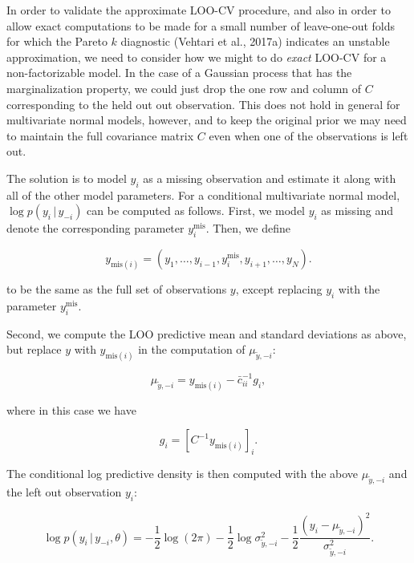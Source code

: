 \documentclass[english,,doc,floatsintext]{apa6}
\theoremstyle{definition}
\theoremstyle{definition}
\theoremstyle{definition}
\theoremstyle{remark}
\begin{document}
In order to validate the approximate LOO-CV procedure, and also in order
to allow exact computations to be made for a small number of
leave-one-out folds for which the Pareto \(k\) diagnostic (Vehtari et
al., 2017a) indicates an unstable approximation, we need to consider how
we might to do \emph{exact} LOO-CV for a non-factorizable model. In the
case of a Gaussian process that has the marginalization property, we
could just drop the one row and column of \(C\) corresponding to the
held out out observation. This does not hold in general for multivariate
normal models, however, and to keep the original prior we may need to
maintain the full covariance matrix \(C\) even when one of the
observations is left out.

The solution is to model \(y_i\) as a missing observation and estimate
it along with all of the other model parameters. For a conditional
multivariate normal model, \(\log p(y_i\,|\,y_{-i})\) can be computed as
follows. First, we model \(y_i\) as missing and denote the corresponding
parameter \(y_i^{\mathrm{mis}}\). Then, we define

\begin{equation}
y_{\mathrm{mis}(i)} = (y_1, \ldots, y_{i-1}, y_i^{\mathrm{mis}}, y_{i+1}, \ldots, y_N).
\end{equation}

to be the same as the full set of observations \(y\), except replacing
\(y_i\) with the parameter \(y_i^{\mathrm{mis}}\).

Second, we compute the LOO predictive mean and standard deviations as
above, but replace \(y\) with \(y_{\mathrm{mis}(i)}\) in the computation
of \(\mu_{\tilde{y},-i}\):

\begin{equation}
\mu_{\tilde{y},-i} = y_{{\mathrm{mis}}(i)}-\bar{c}_{ii}^{-1}g_i,
\end{equation}

where in this case we have

\begin{equation}
g_i = \left[ C^{-1} y_{\mathrm{mis}(i)} \right]_i.
\end{equation}

The conditional log predictive density is then computed with the above
\(\mu_{\tilde{y},-i}\) and the left out observation \(y_i\):

\begin{equation}
  \log p(y_i\,|\,y_{-i},\theta)
  = - \frac{1}{2}\log(2\pi)
  - \frac{1}{2}\log \sigma^2_{\tilde{y},-i}
  - \frac{1}{2}\frac{(y_i-\mu_{\tilde{y},-i})^2}{\sigma^2_{\tilde{y},-i}}.
\end{equation}
\end{document}
